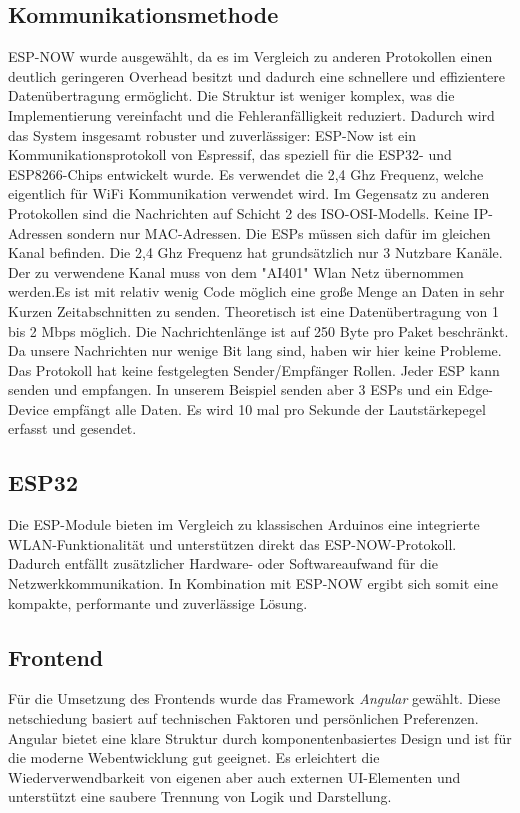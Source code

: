 \subsection{Kommunikationsmethode}
ESP-NOW wurde ausgewählt, da es im Vergleich zu anderen Protokollen einen deutlich geringeren Overhead besitzt und dadurch eine schnellere und effizientere Datenübertragung ermöglicht. Die Struktur ist weniger komplex, was die Implementierung vereinfacht und die Fehleranfälligkeit reduziert. 
Dadurch wird das System insgesamt robuster und zuverlässiger:
ESP-Now ist ein Kommunikationsprotokoll von Espressif, das speziell für die ESP32- und ESP8266-Chips entwickelt wurde. Es verwendet die 2,4 Ghz Frequenz, welche eigentlich für WiFi Kommunikation verwendet wird. 
Im Gegensatz zu anderen Protokollen sind die Nachrichten auf Schicht 2 des ISO-OSI-Modells. Keine IP-Adressen sondern nur MAC-Adressen. Die ESPs müssen sich dafür im gleichen Kanal befinden. Die 2,4 Ghz Frequenz hat grundsätzlich nur 3 Nutzbare Kanäle. 
Der zu verwendene Kanal muss von dem "AI401" Wlan Netz übernommen werden.Es ist mit relativ wenig Code möglich eine große Menge an Daten in sehr Kurzen Zeitabschnitten zu senden. Theoretisch ist eine Datenübertragung von 1 bis 2 Mbps möglich. 
Die Nachrichtenlänge ist auf 250 Byte pro Paket beschränkt. Da unsere Nachrichten nur wenige Bit lang sind, haben wir hier keine Probleme. 
Das Protokoll hat keine festgelegten Sender/Empfänger Rollen. Jeder ESP kann senden und empfangen. In unserem Beispiel senden aber 3 ESPs und ein Edge-Device empfängt alle Daten. 
Es wird 10 mal pro Sekunde der Lautstärkepegel erfasst und gesendet.

\subsection{ESP32}
Die ESP-Module bieten im Vergleich zu klassischen Arduinos eine integrierte WLAN-Funktionalität und unterstützen direkt das ESP-NOW-Protokoll. Dadurch entfällt zusätzlicher Hardware- oder Softwareaufwand für die Netzwerkkommunikation.
In Kombination mit ESP-NOW ergibt sich somit eine kompakte, performante und zuverlässige Lösung.

\subsection{Frontend}
Für die Umsetzung des Frontends wurde das Framework \textit{Angular} gewählt. 
Diese netschiedung basiert auf technischen Faktoren und persönlichen Preferenzen. 
Angular bietet eine klare Struktur durch komponentenbasiertes Design und ist für die moderne Webentwicklung gut geeignet.
Es erleichtert die Wiederverwendbarkeit von eigenen aber auch externen UI-Elementen und unterstützt eine saubere Trennung von Logik und Darstellung. 

